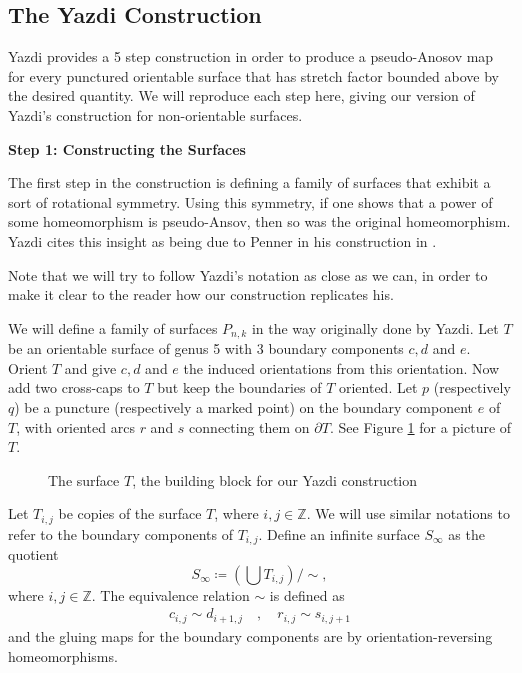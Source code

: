 \subsection{The Yazdi Construction}

Yazdi provides a 5 step construction in order to produce a pseudo-Anosov map for every punctured orientable surface that has stretch factor bounded above by the desired quantity. We will reproduce each step here, giving our version of Yazdi's construction for non-orientable surfaces.

\begin{center}
\textbf{Step 1: Constructing the Surfaces}
\end{center}

The first step in the construction is defining a family of surfaces that exhibit a sort of rotational symmetry. Using this symmetry, if one shows that a power of some homeomorphism is pseudo-Ansov, then so was the original homeomorphism. Yazdi cites this insight as being due to Penner in his construction in \cite{penner1991bounds}.

Note that we will try to follow Yazdi's notation as close as we can, in order to make it clear to the reader how our construction replicates his.

We will define a family of surfaces $P_{n,k}$ in the way originally done by Yazdi. Let $T$ be an orientable surface of genus 5 with 3 boundary components $c,d$ and $e$. Orient $T$ and give $c,d$ and $e$ the induced orientations from this orientation. Now add two cross-caps to $T$ but keep the boundaries of $T$ oriented. Let $p$ (respectively $q$) be a puncture (respectively a marked point) on the boundary component $e$ of $T$, with oriented arcs $r$ and $s$ connecting them on $\partial T$. See Figure \ref{fig:buildingblock} for a picture of $T$.

\begin{figure}[]
    \centering
    \caption{The surface $T$, the building block for our Yazdi construction}
    \label{fig:buildingblock}
\end{figure}

Let $T_{i,j}$ be copies of the surface $T$, where $i,j \in \mathbb{Z}$. We will use similar notations to refer to the boundary components of $T_{i,j}$. Define an infinite surface $S_\infty$ as the quotient
$$S_\infty \coloneqq \left( \bigcup T_{i,j} \right)/\sim,$$
where $i,j \in \mathbb{Z}$. The equivalence relation $\sim$ is defined as
\begin{align*}
    c_{i,j} \sim d_{i+1,j} \hspace{1em}, \hspace{1em} r_{i,j} \sim s_{i,j+1}
\end{align*}
and the gluing maps for the boundary components are by orientation-reversing homeomorphisms.

